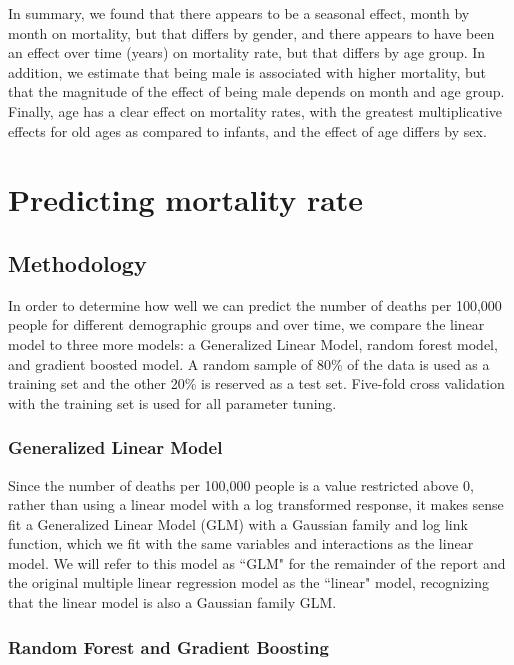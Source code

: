\documentclass[letterpaper, 11pt]{article}
\begin{document}
In summary, we found that there appears to be a seasonal effect, month by month on mortality, but that differs by gender, and there appears to have been an effect over time (years) on mortality rate, but that differs by age group. In addition, we estimate that being male is associated with higher mortality, but that the magnitude of the effect of being male depends on month and age group. Finally, age has a clear effect on mortality rates, with the greatest multiplicative effects for old ages as compared to infants, and the effect of age differs by sex.

\section{Predicting mortality rate}

\subsection{Methodology}

In order to determine how well we can predict the number of deaths per 100,000 people for different demographic groups and over time, we compare the linear model to three more models: a Generalized Linear Model, random forest model, and gradient boosted model. A random sample of 80\% of the data is used as a training set and the other 20\% is reserved as a test set. Five-fold cross validation with the training set is used for all parameter tuning.

\subsubsection{Generalized Linear Model}

Since the number of deaths per 100,000 people is a value restricted above 0, rather than using a linear model with a log transformed response, it makes sense fit a Generalized Linear Model (GLM) with a Gaussian family and log link function, which we fit with the same variables and interactions as the linear model. We will refer to this model as ``GLM" for the remainder of the report and the original multiple linear regression model as the ``linear" model, recognizing that the linear model is also a Gaussian family GLM.

\subsubsection{Random Forest and Gradient Boosting}
\end{document}
